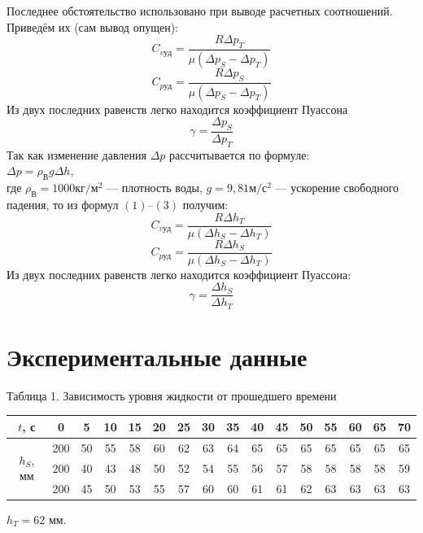 \documentclass[12pt]{article}
\begin{document}
Последнее обстоятельство использовано при выводе расчетных соотношений. Приведём их (сам вывод опущен):
\begin{equation}
	C_{v уд}=\frac{R\Delta p_{T}}{\mu(\Delta p_{S}-\Delta p_{T})} 				
\end{equation}
\begin{equation}
	C_{p уд}=\frac{R\Delta p_{S}}{\mu(\Delta p_{S}-\Delta p_{T})} 				
\end{equation}
Из двух последних равенств легко находится коэффициент Пуассона
\begin{equation}
	\gamma = \frac {\Delta p_{S}}{\Delta p_{T}} 				
\end{equation}
\newpage
Так как изменение давления $\Delta p$ рассчитывается по формуле:\\
$\Delta p=\rho_{В}g\Delta h,$\\
где $\rho_{В} = 1000 кг/м^2$ --- плотность воды, $g = 9,81 м/с^2$ --- ускорение свободного падения, то из формул $(1) – (3)$ получим:
\begin{equation}
	C_{v уд}=\frac{R\Delta h_{T}}{\mu(\Delta h_{S}-\Delta h_{T})} 				
\end{equation}
\begin{equation}
	C_{p уд}=\frac{R\Delta h_{S}}{\mu(\Delta h_{S}-\Delta h_{T})} 				
\end{equation}
Из двух последних равенств легко находится коэффициент Пуассона:
\begin{equation}
	\gamma = \frac {\Delta h_{S}}{\Delta h_{T}} 				
\end{equation}	
\section*{Экспериментальные данные}
\begin{table}[h!]
\begin{center}
Таблица 1. Зависимость уровня жидкости от прошедшего времени
\begin{tabular}{|c|c|c|c|c|c|c|c|c|c|c|c|c|c|c|c|}
\hline
$t$, с&0&5&10&15&20&25&30&35&40&45&50&55&60&65&70\\
\hline
\multirow{3}{*}{$h_{S}$, мм}    & 200&50&55&58&60&62&63&64&65&65&65&65&65&65&65\\
\hhline{~---------------}
&200&40&43&48&50&52&54&55&56&57&58&58&58&58&59\\
\hhline{~---------------}
&200&45&50&53&55&57&60&60&61&61&62&63&63&63&63\\
\hline
\end{tabular}

$h_{T}=62$ мм.
\end{center}

\end{table} 
\end{document}
